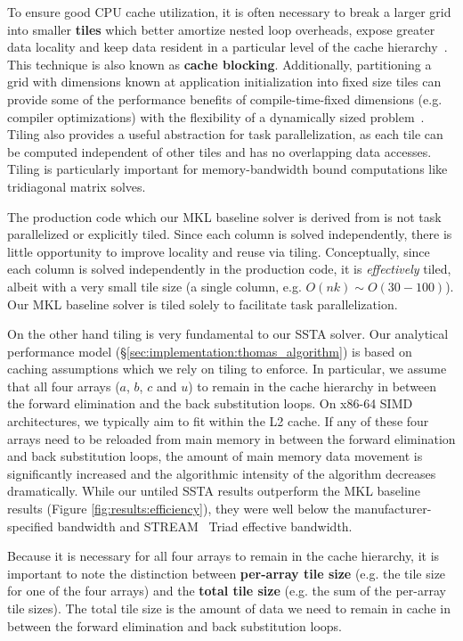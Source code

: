 \documentclass{sig-alternate-05-2015}
\begin{document}
To ensure good CPU cache utilization, it is often necessary to break a larger
  grid into smaller \textbf{tiles} which better amortize nested loop overheads, expose
  greater data locality and keep data resident in a particular level of the
  cache hierarchy~\cite{blocked_algorithms}.
This technique is also known as \textbf{cache blocking}.
Additionally, partitioning a grid with dimensions known at application
  initialization into fixed size tiles can provide some of the performance
  benefits of compile-time-fixed dimensions (e.g. compiler optimizations) with
  the flexibility of a dynamically sized problem~\cite{kokkos}.
Tiling also provides a useful abstraction for task parallelization, as
  each tile can be computed independent of other tiles and has no overlapping
  data accesses.
Tiling is particularly important for memory-bandwidth bound computations like
  tridiagonal matrix solves.

The production code which our MKL baseline solver is derived from is not task
  parallelized or explicitly tiled.
Since each column is solved independently, there is little opportunity to improve
  locality and reuse via tiling.
Conceptually, since each column is solved independently in the production code,
  it is \emph{effectively} tiled, albeit with a very small tile size (a single
  column, e.g. \(O(nk) \sim O(30-100)\)).
Our MKL baseline solver is tiled solely to facilitate task parallelization.

On the other hand tiling is very fundamental to our SSTA solver.
Our analytical performance model (\S\ref{sec:implementation:thomas_algorithm})
  is based on caching assumptions which we rely on tiling to enforce.
In particular, we assume that all four arrays (\(a\), \(b\), \(c\) and \(u\))
  to remain in the cache hierarchy in between the forward elimination and the
  back substitution loops.
On x86-64 SIMD architectures, we typically aim to fit within the L2 cache.
If any of these four arrays need to be reloaded from main memory in between the
  forward elimination and back substitution loops, the amount of main memory data
  movement is significantly increased and the algorithmic intensity of the
  algorithm decreases dramatically.
While our untiled SSTA results outperform the MKL baseline results (Figure
  \ref{fig:results:efficiency}), they were well below the manufacturer-specified
  bandwidth and STREAM~\cite{stream} Triad effective bandwidth.

Because it is necessary for all four arrays to remain in the cache hierarchy, 
  it is important to note the distinction between \textbf{per-array tile size}
  (e.g. the tile size for one of the four arrays) and the
  \textbf{total tile size} (e.g. the sum of the per-array tile sizes).
The total tile size is the amount of data we need to remain in cache in between
  the forward elimination and back substitution loops.
\end{document}
